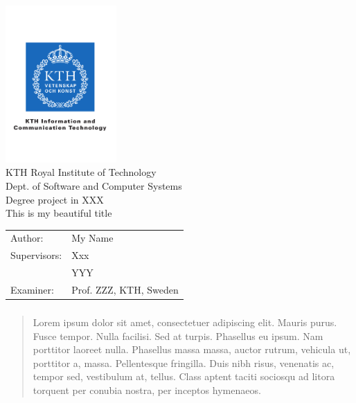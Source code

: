 \documentclass[11pt,a4paper,twoside,openright, abstractoff,titlepage,final,parskip=half*,BCOR10mm]{scrreprt}%
\begin{document}

\begin{titlepage}
\thispagestyle{empty}
\begin{center}
  \includegraphics[height=6cm]{kth_cmyk_info_comm_tech}\\
  \vspace{.5cm}
  \huge{\sc KTH Royal Institute of Technology}\\
  \vspace{.5cm}
  \Large{\sc Dept. of Software and Computer Systems}\\
  \vspace{3.5cm}
  \normalsize Degree project in XXX\\
  \vspace{2mm}		
  \Large{This is my beautiful title}
  \vspace{4.5cm} 
\end{center} 
\begin{tabular}{ll} 
\noindent Author: & My Name \\
\noindent Supervisors: & Xxx \\ 
											 & YYY\\[6ex]
													
\indent Examiner:  &Prof. ZZZ, KTH, Sweden\\ 

\end{tabular}
\end{titlepage}
\newpage




\thispagestyle{empty}
\cleardoublepage

\begin{abstract}

\subsubsection*{\centering\abstractname}


Lorem ipsum dolor sit amet, consectetuer adipiscing elit. Mauris
purus. Fusce tempor. Nulla facilisi. Sed at turpis. Phasellus eu
ipsum. Nam porttitor laoreet nulla. Phasellus massa massa, auctor
rutrum, vehicula ut, porttitor a, massa. Pellentesque fringilla. Duis
nibh risus, venenatis ac, tempor sed, vestibulum at, tellus. Class
aptent taciti sociosqu ad litora torquent per conubia nostra, per
inceptos hymenaeos.

\end{abstract}
\end{document}
